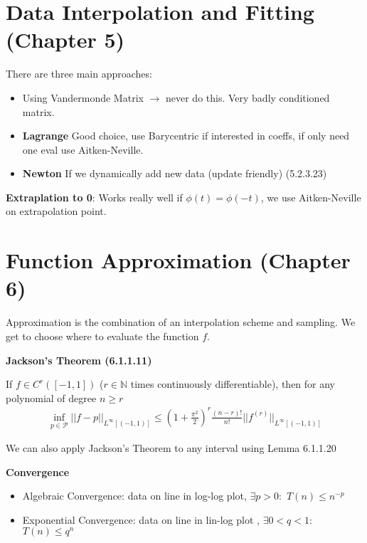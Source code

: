 \documentclass{sciposter}
\newcommand{\TODO}[1]{\todo[inline, color=red!40]{#1}}
\newenvironment{method}[1]{\begin{mdframed}[backgroundcolor=blue!10,innertopmargin=15pt, innerbottommargin=15pt, nobreak=true]
		\textbf{#1 }
	}
	{ 
	\end{mdframed}
}
\newcommand{\psection}[1]{\par \textbf{\large#1}}
\begin{document}
\begin{multicols}{2}
\section*{Data Interpolation and Fitting (Chapter 5)}


There are three main approaches:

\begin{itemize}
	\item Using Vandermonde Matrix $\rightarrow$ never do this. Very badly conditioned matrix.
	\item \textbf{Lagrange} Good choice, use Barycentric if interested in coeffs, if only need one eval use Aitken-Neville.
	\item \textbf{Newton} If we dynamically add new data (update friendly) (5.2.3.23)
\end{itemize}


\textbf{Extraplation to 0}: Works really well if $\phi(t) = \phi(-t)$, we use Aitken-Neville on extrapolation point.


\TODO{KONVERGENZ ZEUGS}




\section*{Function Approximation (Chapter 6)}

Approximation is the combination of an interpolation scheme and sampling. We get to choose where to evaluate the function $f$.

\begin{method}{Jackson's Theorem (6.1.1.11)}
	If $f\in C^r([-1,1])$ ($r\in \mathbb{N}$ times continuously differentiable), then for any polynomial of degree $n \geq r$
	\begin{align*}
		\inf_{p \in \mathcal{P}} || f-p ||_{L^\infty [(-1,1)]} \leq (1 + \frac{\pi^2}{2})^r \frac{(n-r)!}{n!} || f^{(r)} ||_{L^\infty [(-1,1)]}
	\end{align*}
\end{method}

We can also apply Jackson's Theorem to any interval using Lemma 6.1.1.20



\psection{Convergence}


\begin{itemize}
\item Algebraic Convergence: data on line in log-log plot, $\exists p > 0:$  $T(n) \leq n^{-p}$

\item Exponential Convergence: data on line in lin-log plot , $\exists 0 < q < 1:$  $T(n) \leq q^n$


\end{itemize}
\end{multicols}
\end{document}
